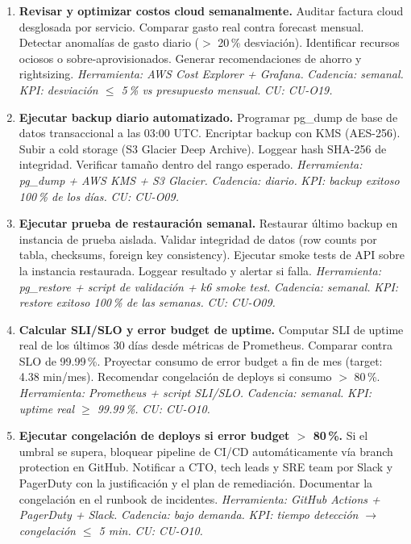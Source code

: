 ﻿\documentclass[11pt, letterpaper]{article}
\begin{document}
\begin{enumerate}[leftmargin=1.5cm, label=\textbf{OP\arabic*}, itemsep=2pt, topsep=4pt]
    \item \textbf{Revisar y optimizar costos cloud semanalmente.} Auditar factura cloud desglosada por servicio. Comparar gasto real contra forecast mensual. Detectar anomalías de gasto diario ($>$ 20\,\% desviación). Identificar recursos ociosos o sobre-aprovisionados. Generar recomendaciones de ahorro y rightsizing. \textit{Herramienta: AWS Cost Explorer + Grafana.} \textit{Cadencia: semanal.} \textit{KPI: desviación $\leq$ 5\,\% vs presupuesto mensual.} \textit{CU: CU-O19.}



    \item \textbf{Ejecutar backup diario automatizado.} Programar pg\_dump de base de datos transaccional a las 03:00 UTC. Encriptar backup con KMS (AES-256). Subir a cold storage (S3 Glacier Deep Archive). Loggear hash SHA-256 de integridad. Verificar tamaño dentro del rango esperado. \textit{Herramienta: pg\_dump + AWS KMS + S3 Glacier.} \textit{Cadencia: diario.} \textit{KPI: backup exitoso 100\,\% de los días.} \textit{CU: CU-O09.}



    \item \textbf{Ejecutar prueba de restauración semanal.} Restaurar último backup en instancia de prueba aislada. Validar integridad de datos (row counts por tabla, checksums, foreign key consistency). Ejecutar smoke tests de API sobre la instancia restaurada. Loggear resultado y alertar si falla. \textit{Herramienta: pg\_restore + script de validación + k6 smoke test.} \textit{Cadencia: semanal.} \textit{KPI: restore exitoso 100\,\% de las semanas.} \textit{CU: CU-O09.}



    \item \textbf{Calcular SLI/SLO y error budget de uptime.} Computar SLI de uptime real de los últimos 30 días desde métricas de Prometheus. Comparar contra SLO de 99.99\,\%. Proyectar consumo de error budget a fin de mes (target: 4.38 min/mes). Recomendar congelación de deploys si consumo $>$ 80\,\%. \textit{Herramienta: Prometheus + script SLI/SLO.} \textit{Cadencia: semanal.} \textit{KPI: uptime real $\geq$ 99.99\,\%.} \textit{CU: CU-O10.}



    \item \textbf{Ejecutar congelación de deploys si error budget $>$ 80\,\%.} Si el umbral se supera, bloquear pipeline de CI/CD automáticamente vía branch protection en GitHub. Notificar a CTO, tech leads y SRE team por Slack y PagerDuty con la justificación y el plan de remediación. Documentar la congelación en el runbook de incidentes. \textit{Herramienta: GitHub Actions + PagerDuty + Slack.} \textit{Cadencia: bajo demanda.} \textit{KPI: tiempo detección $\rightarrow$ congelación $\leq$ 5 min.} \textit{CU: CU-O10.}




\end{enumerate}
\end{document}
